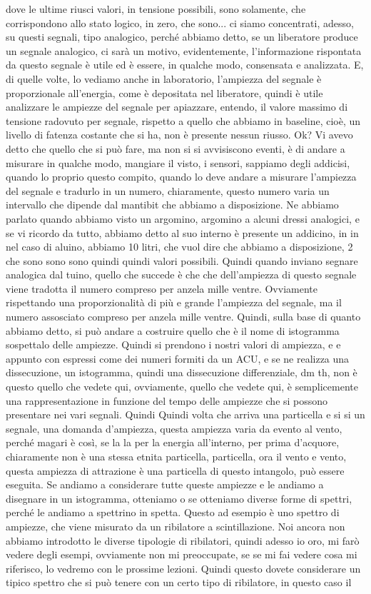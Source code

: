 dove le ultime riusci valori, in tensione possibili, sono solamente, che corrispondono allo stato logico, in zero, che sono... ci siamo concentrati, adesso, su questi segnali, tipo analogico, perché abbiamo detto, se un liberatore produce un segnale analogico, ci sarà un motivo, evidentemente, l'informazione rispontata da questo segnale è utile ed è essere, in qualche modo, consensata e analizzata. E, di quelle volte, lo vediamo anche in laboratorio, l'ampiezza del segnale è proporzionale all'energia, come è depositata nel liberatore, quindi è utile analizzare le ampiezze del segnale per apiazzare, entendo, il valore massimo di tensione radovuto per segnale, rispetto a quello che abbiamo in baseline, cioè, un livello di fatenza costante che si ha, non è presente nessun riusso. Ok? Vi avevo detto che quello che si può fare, ma non si si avvisiscono eventi, è di andare a misurare in qualche modo, mangiare il visto, i sensori, sappiamo degli addicisi, quando lo proprio questo compito, quando lo deve andare a misurare l'ampiezza del segnale e tradurlo in un numero, chiaramente, questo numero varia un intervallo che dipende dal mantibit che abbiamo a disposizione. Ne abbiamo parlato quando abbiamo visto un argomino, argomino a alcuni dressi analogici, e se vi ricordo da tutto, abbiamo detto al suo interno è presente un addicino, in in nel caso di aluino, abbiamo 10 litri, che vuol dire che abbiamo a disposizione, 2 che sono sono sono quindi quindi valori possibili. Quindi quando inviano segnare analogica dal tuino, quello che succede è che che dell'ampiezza di questo segnale viene tradotta il numero compreso per anzela mille ventre. Ovviamente rispettando una proporzionalità di più e grande l'ampiezza del segnale, ma il numero assosciato compreso per anzela mille ventre. Quindi, sulla base di quanto abbiamo detto, si può andare a costruire quello che è il nome di istogramma sospettalo delle ampiezze. Quindi si prendono i nostri valori di ampiezza, e e appunto con espressi come dei numeri formiti da un ACU, e se ne realizza una dissecuzione, un istogramma, quindi una dissecuzione differenziale, dm th, non è questo quello che vedete qui, ovviamente, quello che vedete qui, è semplicemente una rappresentazione in funzione del tempo delle ampiezze che si possono presentare nei vari segnali. Quindi Quindi volta che arriva una particella e si si un segnale, una domanda d'ampiezza, questa ampiezza varia da evento al vento, perché magari è così, se la la per la energia all'interno, per prima d'acquore, chiaramente non è una stessa etnita particella, particella, ora il vento e vento, questa ampiezza di attrazione è una particella di questo intangolo, può essere eseguita. Se andiamo a considerare tutte queste ampiezze e le andiamo a disegnare in un istogramma, otteniamo o se otteniamo diverse forme di spettri, perché le andiamo a spettrino in spetta. Questo ad esempio è uno spettro di ampiezze, che viene misurato da un ribilatore a scintillazione. Noi ancora non abbiamo introdotto le diverse tipologie di ribilatori, quindi adesso io oro, mi farò vedere degli esempi, ovviamente non mi preoccupate, se se mi fai vedere cosa mi riferisco, lo vedremo con le prossime lezioni. Quindi questo dovete considerare un tipico spettro che si può tenere con un certo tipo di ribilatore, in questo caso il 